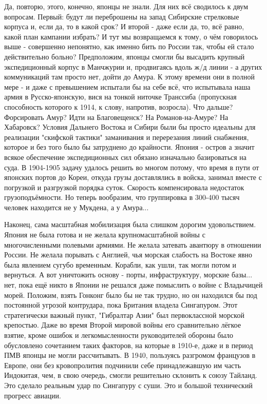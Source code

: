 Да, повторю, этого, конечно, японцы не знали. Для них всё сводилось к двум вопросам. Первый: будут ли переброшены на запад Сибирские стрелковые корпуса и, если да, то в какой срок? И второй - даже если да, то, всё равно, какой план кампании избрать? И тут мы возвращаемся к тому, о чём говорилось выше - совершенно непонятно, как именно бить по России так, чтобы ей стало действительно больно? Предположим, японцы смогли бы высадить крупный экспедиционный корпус в Манчжурии и, продвигаясь вдоль ж/д линии - а других коммуникаций там просто нет, дойти до Амура. К этому времени они в полной мере - и даже с превышением испытали бы на себе всё, что испытывала наша армия в Русско-японскую, вися на тонкой ниточке Транссиба (пропускная способность которого к 1914, к слову, напротив, возросла). Что дальше? Форсировать Амур? Идти на Благовещенск? На Романов-на-Амуре? На Хабаровск? Условия Дальнего Востока и Сибири были бы просто идеальны для реализации "скифской тактики" заманивания и перерезания линий снабжения, которое и без того было бы затруднено до крайности. Япония - остров а значит всякое обеспечение экспедиционных сил обязано изначально базироваться на суда. В 1904-1905 задачу удалось решить во многом потому, что время в пути от японских портов до Кореи, откуда грузы доставлялись в войска, занимал вместе с погрузкой и разгрузкой порядка суток. Скорость компенсировала недостаток грузоподъёмности. Но теперь вообразим, что группировка в 300-400 тысяч человек находится не у Мукдена, а у Амура...

Наконец, сама масштабная мобилизация была слишком дорогим удовольствием. Япония не была готова и не желала крупномасштабной войны с многочисленными полевыми армиями. Не желала затевать авантюру в отношении России. Не желала порывать с Англией, чья морская слабость на Востоке явно была явлением сугубо временным. Корабли, как ушли, так могли потом и вернуться. А вот уничтожить основу - порты, инфраструктуру, морские базы... нет, пока ещё никто в Японии не решался даже помыслить о войне с Владычицей морей. Положим, взять Гонконг было бы не так трудно, но он находился бы под постоянной угрозой контрудара, пока Британия владела Сингапуром. Этот стратегически важный пункт, "Гибралтар Азии" был первоклассной морской крепостью. Даже во время Второй мировой войны его сравнительно лёгкое взятие, кроме ошибок и легкомысленности руководителей обороны было обусловлено сочетанием таких факторов, на которые в 1910-е, даже и в период ПМВ японцы не могли рассчитывать. В 1940, пользуясь разгромом французов в Европе, они без кровопролития подчинили себе принадлежавшую им часть Индокитая, чем, в свою очередь, смогли решительно склонить к союзу Тайланд. Это сделало реальным удар по Сингапуру с суши. Это и большой технический прогресс авиации.

